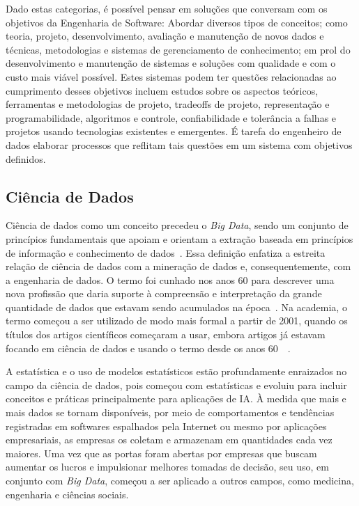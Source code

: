 \documentclass[portugues]{ic-tese}
\begin{document}
Dado estas categorias, é possível pensar em soluções que conversam com os objetivos da Engenharia de Software: Abordar diversos tipos de conceitos; como teoria, projeto, desenvolvimento, avaliação e manutenção de novos dados e técnicas, metodologias e sistemas de gerenciamento de conhecimento; em prol do desenvolvimento e manutenção de sistemas e soluções com qualidade e com o custo mais viável possível. Estes sistemas podem ter questões relacionadas ao cumprimento desses objetivos incluem estudos sobre os aspectos teóricos, ferramentas e metodologias de projeto, tradeoffs de projeto, representação e programabilidade, algoritmos e controle, confiabilidade e tolerância a falhas e projetos usando tecnologias existentes e emergentes. É tarefa do engenheiro de dados elaborar processos que reflitam tais questões em um sistema com objetivos definidos.

\subsection{Ciência de Dados}

Ciência de dados como um conceito precedeu o \textit{Big Data}, sendo um conjunto de princípios fundamentais que apoiam e orientam a extração baseada em princípios de informação e conhecimento de dados~\citep{Raban_2020}. Essa definição enfatiza a estreita relação de ciência de dados com a mineração de dados e, consequentemente, com a engenharia de dados. O termo foi cunhado nos anos 60 para descrever uma nova profissão que daria suporte à compreensão e interpretação da grande quantidade de dados que estavam sendo acumulados na época~\citep{Foote_2021}. Na academia, o termo começou a ser utilizado de modo mais formal a partir de 2001, quando os títulos dos artigos científicos começaram a usar, embora artigos já estavam focando em ciência de dados e usando o termo desde os anos 60~\citep{Raban_2020}~\citep{Foote_2021}. 

A estatística e o uso de modelos estatísticos estão profundamente enraizados no campo da ciência de dados, pois começou com estatísticas e evoluiu para incluir conceitos e práticas principalmente para aplicações de IA. À medida que mais e mais dados se tornam disponíveis, por meio de comportamentos e tendências registradas em softwares espalhados pela Internet ou mesmo por aplicações empresariais, as empresas os coletam e armazenam em quantidades cada vez maiores. Uma vez que as portas foram abertas por empresas que buscam aumentar os lucros e impulsionar melhores tomadas de decisão, seu uso, em conjunto com \textit{Big Data}, começou a ser aplicado a outros campos, como medicina, engenharia e ciências sociais.
\end{document}
